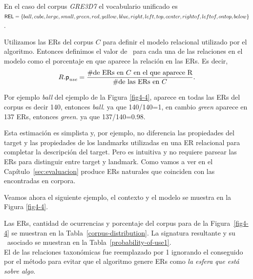 En el caso del corpus \textit{GRE3D7} el vocabulario unificado es 
$\textsf{REL} = \{ball, cube, large, small,\\
green, red, yellow, blue, right, left, top, center, rightof, leftof, ontop,
below\} $.

 Utilizamos las ERs del corpus $C$
para definir el modelo relacional utilizado por el algoritmo. Entonces 
definimos el valor de \puse\ para cada una de las relaciones en el modelo como el
porcentaje en que aparece la relaci\'on en las ERs. Es decir,
\begin{equation} \label{eq1}
R.\textsf{p}_\textit{use} = \frac {\#\mbox{de ERs en $C$ en el que aparece R}} {\#\mbox{de las ERs en $C$}}.
\end{equation}

Por ejemplo {\it ball} del ejemplo de la Figura \ref{fig4-4}, aparece en todas las ERs del corpus es decir 140, entonces {\it ball}. ya que 140/140=1, en cambio {\it green} aparece en 137 ERs, entonces {\it green}. ya que 137/140=0.98.

Esta estimaci\'on es simplista y, por ejemplo, no 
diferencia las propiedades del target y las propiedades de
los landmarks utilizadas en una ER relacional para completar la descripci\'on
del target. Pero es intuitiva y no requiere parsear las ERs para distinguir entre target y landmark. Como vamos a ver
en el Cap\'itulo~\ref{sec:evaluacion} produce ERs naturales
que coinciden con las encontradas en corpora.

Veamos ahora el siguiente ejemplo, el contexto y el modelo se muestra en la Figura \ref{fig4-4}.


Las ERs, cantidad de ocurrencias y porcentaje del corpus para de la Figura~\ref{fig4-4} se muestran en la Tabla~\ref{corpus-distribution}. La signatura resultante y su \puse\ asociado se muestran en la Tabla~\ref{probability-of-use1}.\\

El \puse de las relaciones taxon\'omicas fue reemplazado por 1 ignorando el \puse conseguido por el m\'etodo para evitar que el algoritmo genere ERs como {\it la esfera que est\'a sobre algo}.

